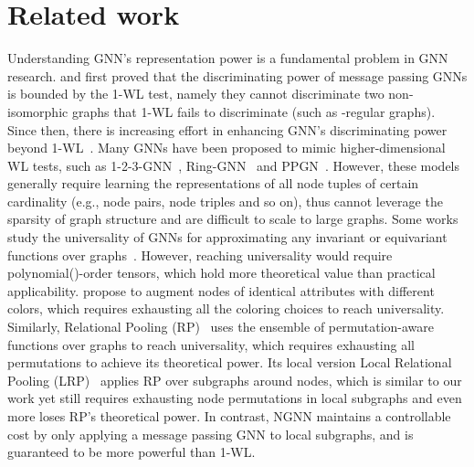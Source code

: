 \documentclass{article}
\begin{document}
\section{Related work}


Understanding GNN's representation power is a fundamental problem in GNN research. \citet{xu2018powerful} and \citet{morris2019weisfeiler} first proved that the discriminating power of message passing GNNs is bounded by the 1-WL test, namely they cannot discriminate two non-isomorphic graphs that 1-WL fails to discriminate (such as -regular graphs). Since then, there is increasing effort in enhancing GNN's discriminating power beyond 1-WL~\citep{morris2019weisfeiler,chen2019equivalence,maron2019provably,murphy2019relational,li2020distance,bouritsas2020improving,you2021identity,beaini2020directional,morris2020weisfeiler}. Many GNNs have been proposed to mimic higher-dimensional WL tests, such as 1-2-3-GNN~\citep{morris2019weisfeiler}, Ring-GNN~\citep{chen2019equivalence} and PPGN~\citep{maron2019provably}. However, these models generally require learning the representations of all node tuples of certain cardinality (e.g., node pairs, node triples and so on), thus cannot leverage the sparsity of graph structure and are difficult to scale to large graphs. Some works study the universality of GNNs for approximating any invariant or equivariant functions over graphs~\citep{maron2018invariant,chen2019equivalence,maron2019universality,keriven2019universal,azizian2020characterizing}. However, reaching universality would require polynomial()-order tensors, which hold more theoretical value than practical applicability. \citet{dasoulas2019coloring} propose to augment nodes of identical attributes with different colors, which requires exhausting all the coloring choices to reach universality. Similarly, Relational Pooling (RP)~\citep{murphy2019relational} uses the ensemble of permutation-aware functions over graphs to reach universality, which requires exhausting all  permutations to achieve its theoretical power. Its local version Local Relational Pooling (LRP)~\citep{chen2020can} applies RP over subgraphs around nodes, which is similar to our work yet still requires exhausting node permutations in local subgraphs and even more loses RP's theoretical power. In contrast, NGNN maintains a controllable cost by only applying a message passing GNN to local subgraphs, and is guaranteed to be more powerful than 1-WL. 
\end{document}
